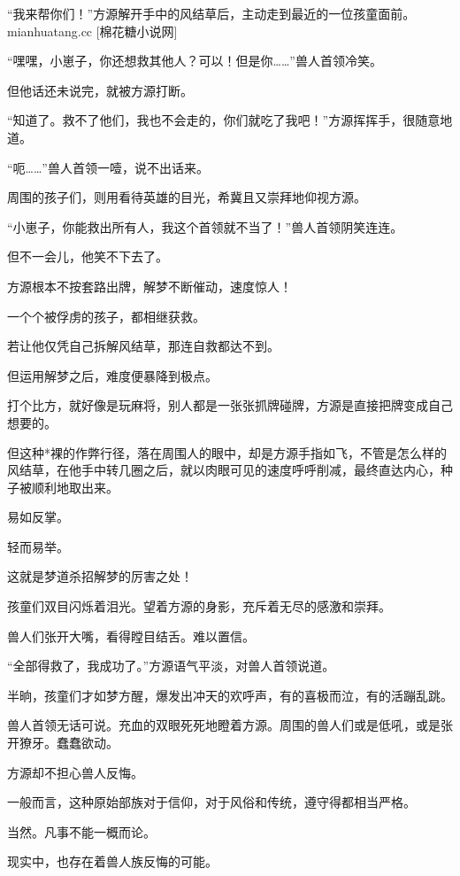 
\begin{this_body}

“我来帮你们！”方源解开手中的风结草后，主动走到最近的一位孩童面前。mianhuatang.cc [棉花糖小说网]

“嘿嘿，小崽子，你还想救其他人？可以！但是你……”兽人首领冷笑。

但他话还未说完，就被方源打断。

“知道了。救不了他们，我也不会走的，你们就吃了我吧！”方源挥挥手，很随意地道。

“呃……”兽人首领一噎，说不出话来。

周围的孩子们，则用看待英雄的目光，希冀且又崇拜地仰视方源。

“小崽子，你能救出所有人，我这个首领就不当了！”兽人首领阴笑连连。

但不一会儿，他笑不下去了。

方源根本不按套路出牌，解梦不断催动，速度惊人！

一个个被俘虏的孩子，都相继获救。

若让他仅凭自己拆解风结草，那连自救都达不到。

但运用解梦之后，难度便暴降到极点。

打个比方，就好像是玩麻将，别人都是一张张抓牌碰牌，方源是直接把牌变成自己想要的。

但这种*裸的作弊行径，落在周围人的眼中，却是方源手指如飞，不管是怎么样的风结草，在他手中转几圈之后，就以肉眼可见的速度呼呼削减，最终直达内心，种子被顺利地取出来。

易如反掌。

轻而易举。

这就是梦道杀招解梦的厉害之处！

孩童们双目闪烁着泪光。望着方源的身影，充斥着无尽的感激和崇拜。

兽人们张开大嘴，看得瞠目结舌。难以置信。

“全部得救了，我成功了。”方源语气平淡，对兽人首领说道。

半晌，孩童们才如梦方醒，爆发出冲天的欢呼声，有的喜极而泣，有的活蹦乱跳。

兽人首领无话可说。充血的双眼死死地瞪着方源。周围的兽人们或是低吼，或是张开獠牙。蠢蠢欲动。

方源却不担心兽人反悔。

一般而言，这种原始部族对于信仰，对于风俗和传统，遵守得都相当严格。

当然。凡事不能一概而论。

现实中，也存在着兽人族反悔的可能。


\end{this_body}
